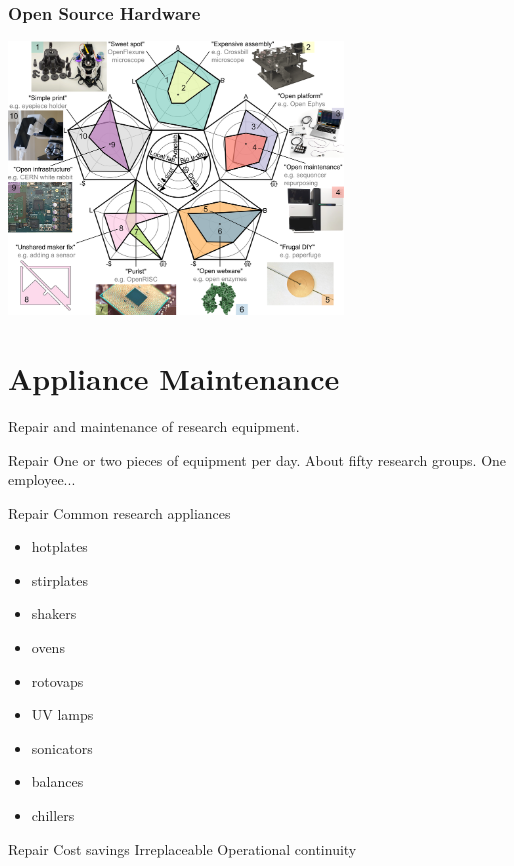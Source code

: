 \documentclass{presentation}
\begin{document}
\begin{frame}\frametitle{Open Source Hardware}
  \centering
  \includegraphics[width=3.5in]{"./journal.pbio.3001931.g002.PNG"}
\end{frame}

\section{Appliance Maintenance}

\begin{frame}
  \huge
  Repair and maintenance of research equipment.
\end{frame}

\begin{frame}{Repair}
  \huge
  One or two pieces of equipment per day.
  \vfill
  About fifty research groups.
  \vfill
  One employee...
\end{frame}

\begin{frame}{Repair}
  Common research appliances
  \begin{itemize}
    \item hotplates
    \item stirplates
    \item shakers
    \item ovens
    \item rotovaps
    \item UV lamps
    \item sonicators
    \item balances
    \item chillers
  \end{itemize}
\end{frame}

\begin{frame}{Repair}
  Cost savings
  \vfill
  Irreplaceable
  \vfill
  \huge
  Operational continuity
\end{frame}
\end{document}
